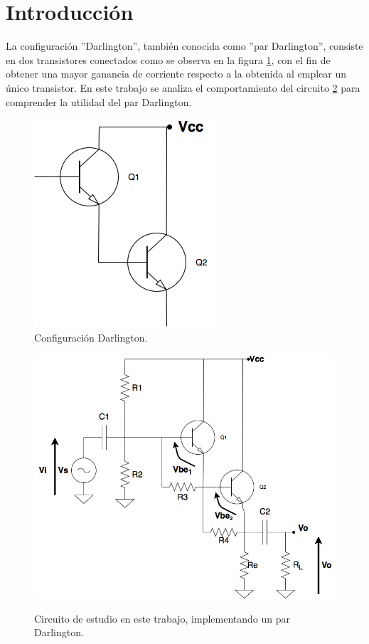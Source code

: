 \section{Introducci\'on}

La configuraci\'on ''Darlington'', tambi\'en conocida como ''par Darlington'', consiste en dos transistores conectados como se observa en la figura \ref{darlington_ideal}, con el fin de obtener una mayor ganancia de corriente respecto a la obtenida al emplear un \'unico transistor. En este trabajo se analiza el comportamiento del circuito \ref{darlington_tp} para comprender la utilidad del par Darlington.

\begin{figure}[H]
	\centering
		\includegraphics[scale=0.4]{./Imagenes/darlington_ideal.png} 
	\caption{Configuraci\'on Darlington.}
	\label{darlington_ideal}
\end{figure}

\begin{figure}[H]
	\centering
		\includegraphics[scale=0.4]{./Imagenes/darlington_tp.png} \\
	\caption{Circuito de estudio en este trabajo, implementando un par Darlington.}
	\label{darlington_tp}
\end{figure}

